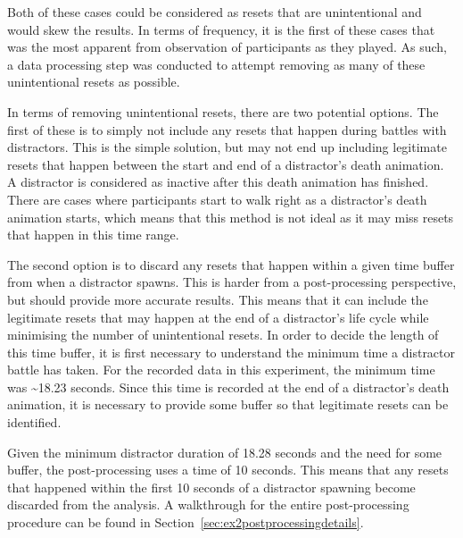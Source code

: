 Both of these cases could be considered as resets that are unintentional and would skew the results. In terms of frequency, it is the first of these cases that was the most apparent from observation of participants as they played. As such, a data processing step was conducted to attempt removing as many of these unintentional resets as possible. 

In terms of removing unintentional resets, there are two potential options. The first of these is to simply not include any resets that happen during battles with distractors. This is the simple solution, but may not end up including legitimate resets that happen between the start and end of a distractor's death animation. A distractor is considered as inactive after this death animation has finished. There are cases where participants start to walk right as a distractor's death animation starts, which means that this method is not ideal as it may miss resets that happen in this time range. 

The second option is to discard any resets that happen within a given time buffer from when a distractor spawns. This is harder from a post-processing perspective, but should provide more accurate results. This means that it can include the legitimate resets that may happen at the end of a distractor's life cycle while minimising the number of unintentional resets. 
In order to decide the length of this time buffer, it is first necessary to understand the minimum time a distractor battle has taken. For the recorded data in this experiment, the minimum time was \textasciitilde18.23 seconds. Since this time is recorded at the end of a distractor's death animation, it is necessary to provide some buffer so that legitimate resets can be identified.

Given the minimum distractor duration of 18.28 seconds and the need for some buffer, the post-processing uses a time of 10 seconds. This means that any resets that happened within the first 10 seconds of a distractor spawning become discarded from the analysis. A walkthrough for the entire post-processing procedure can be found in Section~\ref{sec:ex2postprocessingdetails}.


